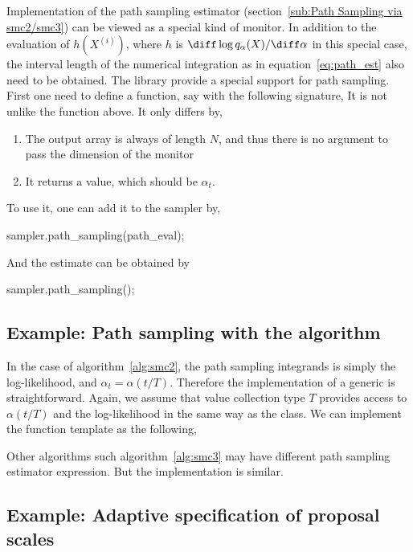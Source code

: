 Implementation of the path sampling estimator (section~\ref{sub:Path Sampling
  via smc2/smc3}) can be viewed as a special kind of monitor. In addition to
the evaluation of $h(X^{(i)})$, where $h$ is $\diff\log
q_{\alpha}(X)/\diff\alpha$ in this special case, the interval length of the
numerical integration as in equation~\eqref{eq:path_est} also need to be
obtained. The \vsmc library provide a special support for path sampling. First
one need to define a function, say  with the following
signature,
It is not unlike the  function above. It only differs
by,
\begin{enumerate}
  \item The output array  is always of length $N$, and thus
    there is no argument to pass the dimension of the monitor
  \item It returns a value, which should be $\alpha_t$.
\end{enumerate}
To use it, one can add it to the sampler by,
\begin{cppcode}
sampler.path_sampling(path_eval);
\end{cppcode}
And the estimate can be obtained by
\begin{cppcode}
sampler.path_sampling();
\end{cppcode}

\subsection{Example: Path sampling with the \smc[2] algorithm}
\label{sub:Example: Path sampling with the SMC2 algorithm}

In the case of algorithm~\ref{alg:smc2}, the path sampling integrands is
simply the log-likelihood, and $\alpha_t = \alpha(t/T)$. Therefore the
implementation of a generic  is straightforward. Again,
we assume that value collection type $T$ provides access to $\alpha(t/T)$ and
the log-likelihood in the same way as the  class. We can
implement the function template as the following,

Other \smc algorithms such algorithm~\ref{alg:smc3} may have different path
sampling estimator expression. But the implementation is similar.

\subsection{Example: Adaptive specification of proposal scales}
\label{sub:Example: Adaptive specification of proposal scales}

